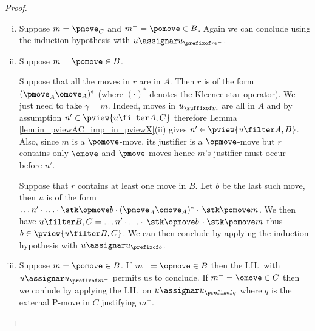 \begin{proof}
\begin{enumerate}[i.]
\item Suppose $m = \pmove_C$ and $m^- = \pomove \in B$.
Again we can conclude using
the induction hypothesis with $u \assignar u_{\prefixof m^-}$.

\item Suppose $m = \pomove \in B$.

Suppose that all the moves in $r$ are in $A$.
Then $r$ is of the form $(\pmove_A \omove_A)^*$ (where $(\cdot)^*$ denotes the Kleenee star operator).
We just need to take $\gamma = m$.
Indeed, moves in $u_{\suffixof m}$ are all in $A$
and by assumption $n'\in\pview{u\filter A,C}$  therefore
Lemma \ref{lem:in_pviewAC_imp_in_pviewX}(ii) gives
$n'\in\pview{u\filter A,B}$.
Also, since $m$ is a $\pomove$-move,
its justifier is a $\opmove$-move but $r$ contains only $\omove$ and $\pmove$ moves hence $m$'s justifier must occur before $n'$.

Suppose that $r$ contains at least one move in $B$. Let $b$ be the last such move, then $u$ is of the form $\ldots n' \cdot \ldots \cdot \stk\opmove  b \cdot (\pmove_A \omove_A)^* \cdot\thinspace\stk\pomove m $. We then have
$u\filter B,C = \ldots n' \cdot \ldots \cdot
\thinspace\stk\opmove b \thinspace\cdot \stk\pomove m $ thus $b \in \pview{u\filter B,C}$. We can then conclude by applying the induction hypothesis with $u \assignar u_{\prefixof b}$.

\item Suppose $m = \pomove \in B$.
If $m^- = \opmove \in B$ then the I.H.\ with $u \assignar u_{\prefixof m^-}$ permits us to conclude.
If $m^- = \omove \in C$ then we conlude by applying  the I.H.\ on $u \assignar u_{\prefixof q}$ where $q$ is the external P-move in $C$ justifying
$m^-$.
\end{enumerate}
\end{proof}

